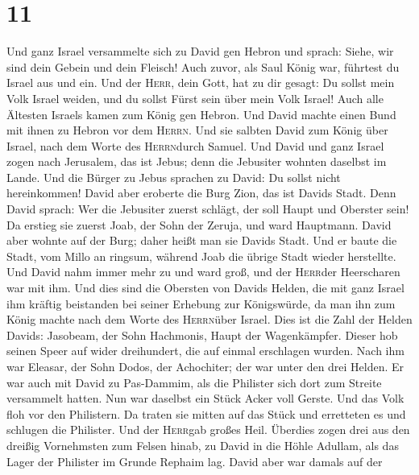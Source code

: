 \hypertarget{section-10}{%
\section{11}\label{section-10}}

 Und ganz Israel versammelte sich zu David gen Hebron und
sprach: Siehe, wir sind dein Gebein und dein Fleisch! 
Auch zuvor, als Saul König war, führtest du Israel aus und ein. Und der
\textsc{Herr}, dein Gott, hat zu dir gesagt: Du sollst mein Volk Israel
weiden, und du sollst Fürst sein über mein Volk Israel! 
Auch alle Ältesten Israels kamen zum König gen Hebron. Und David machte
einen Bund mit ihnen zu Hebron vor dem \textsc{Herrn}. Und sie salbten
David zum König über Israel, nach dem Worte des \textsc{Herrn}durch
Samuel.  Und David und ganz Israel zogen nach Jerusalem,
das ist Jebus; denn die Jebusiter wohnten daselbst im Lande.
 Und die Bürger zu Jebus sprachen zu David: Du sollst
nicht hereinkommen! David aber eroberte die Burg Zion, das ist Davids
Stadt.  Denn David sprach: Wer die Jebusiter zuerst
schlägt, der soll Haupt und Oberster sein! Da erstieg sie zuerst Joab,
der Sohn der Zeruja, und ward Hauptmann.  David aber
wohnte auf der Burg; daher heißt man sie Davids Stadt. 
Und er baute die Stadt, vom Millo an ringsum, während Joab die übrige
Stadt wieder herstellte.  Und David nahm immer mehr zu und
ward groß, und der \textsc{Herr}der Heerscharen war mit ihm.
 Und dies sind die Obersten von Davids Helden, die mit
ganz Israel ihm kräftig beistanden bei seiner Erhebung zur Königswürde,
da man ihn zum König machte nach dem Worte des \textsc{Herrn}über
Israel.  Dies ist die Zahl der Helden Davids: Jasobeam,
der Sohn Hachmonis, Haupt der Wagenkämpfer. Dieser hob seinen Speer auf
wider dreihundert, die auf einmal erschlagen wurden. 
Nach ihm war Eleasar, der Sohn Dodos, der Achochiter; der war unter den
drei Helden.  Er war auch mit David zu Pas-Dammim, als
die Philister sich dort zum Streite versammelt hatten. Nun war daselbst
ein Stück Acker voll Gerste. Und das Volk floh vor den Philistern.
 Da traten sie mitten auf das Stück und erretteten es und
schlugen die Philister. Und der \textsc{Herr}gab großes Heil.
 Überdies zogen drei aus den dreißig Vornehmsten zum
Felsen hinab, zu David in die Höhle Adullam, als das Lager der Philister
im Grunde Rephaim lag.  David aber war damals auf der
